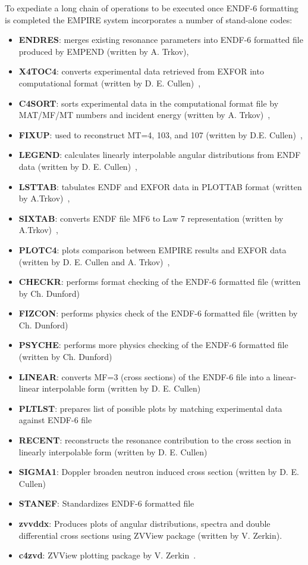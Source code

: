 \documentclass[twocolumn,amsmath,amssymb,10pt,groupedaddress,a4paper]{revtex4}
\begin{document}
To expediate a long chain of operations to be executed once ENDF-6 formatting is completed
the EMPIRE system incorporates a number of stand-alone codes:
\begin{itemize}
\item \textbf{ENDRES}: merges existing resonance parameters
into ENDF-6 formatted file produced by EMPEND (written by A. Trkov),
\item \textbf{X4TOC4}: converts experimental data retrieved
from EXFOR into computational format (written by D. E. Cullen)~\cite{PREPRO},
\item \textbf{C4SORT}: sorts experimental data in the computational
format file by MAT/MF/MT numbers and incident energy (written by A. Trkov)~\cite{ENDVER},
\item \textbf{FIXUP}: used to reconstruct MT=4, 103, and
107 (written by D.E. Cullen)~\cite{PREPRO},
\item \textbf{LEGEND}: calculates linearly interpolable
angular distributions from ENDF data (written by D. E. Cullen)~\cite{PREPRO},
\item \textbf{LSTTAB}: tabulates ENDF and EXFOR data in
PLOTTAB format (written by A.Trkov)~\cite{ENDVER},
\item \textbf{SIXTAB}: converts ENDF file MF6 to Law 7 representation
(written by A.Trkov)~\cite{ENDVER},
\item \textbf{PLOTC4}: plots comparison between EMPIRE results
and EXFOR data (written by D. E. Cullen and A. Trkov)~\cite{ENDVER},
\item \textbf{CHECKR}: performs format checking of the ENDF-6
formatted file (written by Ch. Dunford)
\item \textbf{FIZCON}: performs physics check of the ENDF-6 formatted file
(written by Ch. Dunford)
\item \textbf{PSYCHE}: performs more physics checking of the ENDF-6 formatted
file (written by Ch. Dunford)
\item \textbf{LINEAR}: converts MF=3 (cross sections) of the ENDF-6 file
into a linear-linear interpolable form (written by D. E. Cullen)~\cite{PREPRO}
\item \textbf{PLTLST}: prepares list of possible plots by matching experimental
data against ENDF-6 file
\item \textbf{RECENT}: reconstructs the resonance contribution to the cross
section in linearly interpolable form (written by D. E. Cullen)~\cite{PREPRO}
\item \textbf{SIGMA1}: Doppler broaden neutron induced cross section (written
by D. E. Cullen)~\cite{PREPRO}
\item \textbf{STANEF}: Standardizes ENDF-6 formatted file
\item \textbf{zvvddx}: Produces plots of angular distributions, spectra
and double differential cross sections using ZVView package (written
by V. Zerkin).
\item \textbf{c4zvd}: ZVView\textbf{} plotting package by
V. Zerkin~\cite{ZVView}.
\end{itemize}
\end{document}
